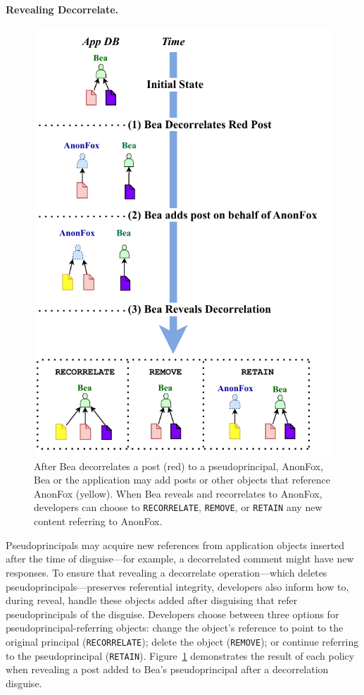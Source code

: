 \paragraph{Revealing Decorrelate.}
%
%
\begin{figure}
    \centering
    \includegraphics[width=.7\textwidth]{figs/ppreveal_policies}
    \caption[\texttt{RECORRELATE}, \texttt{REMOVE}, and
    \texttt{RETAIN} policies maintain referential integrity for objects added after disguising that refer to
    a pseudoprincipal during reveal.]{After Bea decorrelates a post (red) to a pseudoprincipal,
    AnonFox, Bea or the application may add posts or other objects that
    reference AnonFox (yellow). When Bea reveals and recorrelates to AnonFox, developers
    can choose to \texttt{RECORRELATE}, \texttt{REMOVE}, or \texttt{RETAIN} any
    new content referring to AnonFox.}
\label{f:ppreveal}
\end{figure}
%

Pseudoprincipals may acquire new references from application objects inserted
after the time of disguise---for example, a decorrelated comment might have new
responses. To ensure that revealing a decorrelate operation---which deletes
pseudoprincipals---preserves referential integrity, developers also inform \sys
how to, during reveal, handle these objects added after disguising that refer
pseudoprincipals of the disguise. 
%
Developers choose between three options for pseudoprincipal-referring objects:
\one{} change the object's reference to point to the original principal
(\texttt{RECORRELATE}); \two{} delete the object (\texttt{REMOVE}); or \three{}
continue referring to the pseudoprincipal (\texttt{RETAIN}).
Figure~\ref{f:ppreveal} demonstrates the result of each policy when revealing a post
added to Bea's pseudoprincipal after a decorrelation disguise.

